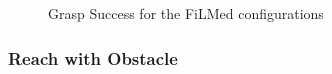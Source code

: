 \begin{figure}[htpb]
  \caption{Grasp Success for the FiLMed configurations}\label{fig:base-grasp-success-smaller}
\end{figure}

\subsubsection{Reach with Obstacle}

